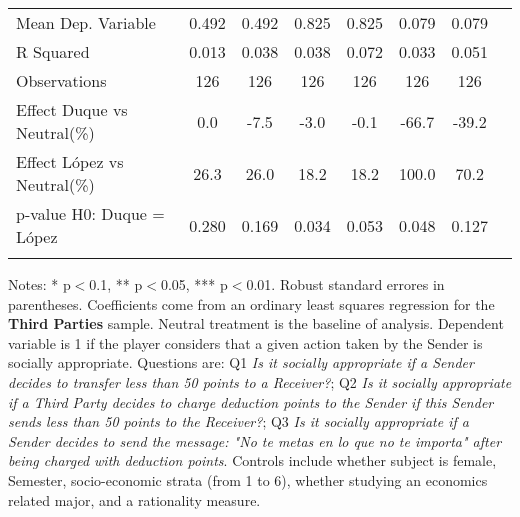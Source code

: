 \begin{table}[H]
{\begin{threeparttable}
\begin{tabular}{lccccccc}
\midrule
Mean Dep. Variable  &       0.492         &       0.492         &       0.825         &       0.825         &       0.079         &       0.079         \\
R Squared           &       0.013         &       0.038         &       0.038         &       0.072         &       0.033         &       0.051         \\
Observations        &         126         &         126         &         126         &         126         &         126         &         126         \\
\midrule
Effect Duque vs Neutral(\%)&         0.0         &        -7.5         &        -3.0         &        -0.1         &       -66.7         &       -39.2         \\
Effect López vs Neutral(\%)&        26.3         &        26.0         &        18.2         &        18.2         &       100.0         &        70.2         \\
p-value H0: Duque = López&       0.280         &       0.169         &       0.034         &       0.053         &       0.048         &       0.127         \\
\bottomrule[0.5pt]
\label{tab:table2}
\end{tabular}
\vspace{-13pt}
\begin{tablenotes}[flushleft]{\setlength{\itemindent}{-3pt}}
\small
\item
Notes:
*
p$<$0.1,
**
p$<$0.05,
***
p$<$0.01.
Robust
standard
errores
in
parentheses.
Coefficients
come
from
an
ordinary
least
squares
regression
for
the
\textbf{Third
Parties}
sample.
Neutral
treatment
is
the
baseline
of
analysis.
Dependent
variable
is
1
if
the
player
considers
that
a
given
action
taken
by
the
Sender
is
socially
appropriate.
Questions
are:
Q1
\textit{Is
it
socially
appropriate
if
a
Sender
decides
to
transfer
less
than
50
points
to
a
Receiver?};
Q2
\textit{Is
it
socially
appropriate
if
a
Third
Party
decides
to
charge
deduction
points
to
the
Sender
if
this
Sender
sends
less
than
50
points
to
the
Receiver?};
Q3
\textit{Is
it
socially
appropriate
if
a
Sender
decides
to
send
the
message:
\textit{"No
te
metas
en
lo
que
no
te
importa"}
after
being
charged
with
deduction
points}.
Controls
include
whether
subject
is
female,
Semester,
socio-economic
strata
(from
1
to
6),
whether
studying
an
economics
related
major,
and
a
rationality
measure.
\end{tablenotes}
\end{threeparttable}
}
\end{table}
